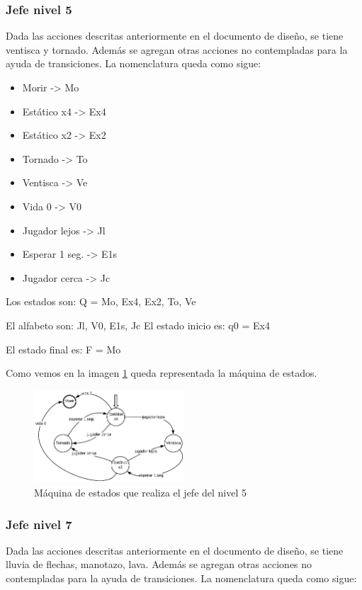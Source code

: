 \subsubsection{Jefe nivel 5}
Dada las acciones descritas anteriormente en el documento de diseño, se tiene ventisca y tornado. Además se agregan otras acciones no contempladas para la ayuda de transiciones.
La nomenclatura queda como sigue:
\\[1pt]

\begin{itemize}
	\item Morir -> Mo
	\item Estático x4 -> Ex4
	\item Estático x2 -> Ex2
	\item Tornado -> To
	\item Ventisca -> Ve
	\item Vida 0 -> V0
	\item Jugador lejos -> Jl
	\item Esperar 1 seg. -> E1s
	\item Jugador cerca -> Jc
\end{itemize}

Los estados son:
Q = {Mo, Ex4, Ex2, To, Ve}

El alfabeto son:
{Jl, V0, E1s, Jc}
El estado inicio es:
q0 = {Ex4}

El estado final es:
F = {Mo}

Como vemos en la imagen \ref{fig:maqN5} queda representada la máquina de estados.

\begin{figure}
	\centering
	\caption{Máquina de estados que realiza el jefe del nivel 5}
	\label{fig:maqN5}
	\includegraphics[width=0.5\textwidth]{02Antecedentes/ajustesR/imagenes/N5}
\end{figure}

\subsubsection{Jefe nivel 7}
Dada las acciones descritas anteriormente en el documento de diseño, se tiene lluvia de flechas, manotazo, lava. Además se agregan otras acciones no contempladas para la ayuda de transiciones.
La nomenclatura queda como sigue:

